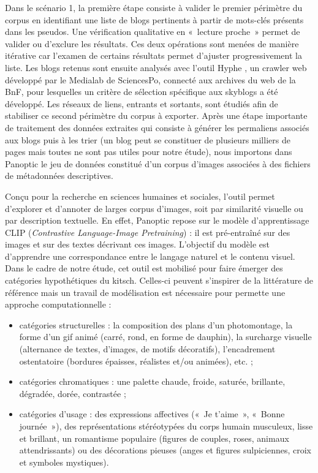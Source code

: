 \documentclass[final, fra]{anthology-ch}     %
\begin{document}
Dans le scénario 1, la première étape consiste à valider le premier périmètre du corpus en identifiant une liste de blogs pertinents à partir de mots-clés présents dans les pseudos. Une vérification qualitative en  «~lecture proche~» permet de valider ou d’exclure les résultats. Ces deux opérations sont menées de manière itérative car l’examen de certains résultats permet d’ajuster progressivement la liste. Les blogs retenus sont ensuite analysés avec l’outil Hyphe \cite{OOGHE-TABANOUHyperlinknotdead2018}, un crawler web développé par le Medialab de SciencesPo, connecté aux archives du web de la BnF, pour lesquelles un critère de sélection spécifique aux skyblogs a été développé. Les réseaux de liens, entrants et sortants, sont étudiés afin de stabiliser ce second périmètre du corpus à exporter.
Après une étape importante de traitement des données extraites qui consiste à générer les permaliens associés aux blogs puis à les trier (un blog peut se constituer de plusieurs milliers de pages mais toutes ne sont pas utiles pour notre étude), nous importons dans Panoptic \cite{ALIEExplorelargedatasets2025, BOUTEPANOPTICoutildexploration2024} le jeu de données constitué d’un corpus d’images associées à des fichiers de métadonnées descriptives. 

Conçu pour la recherche en sciences humaines et sociales, l’outil permet d’explorer et d’annoter de larges corpus d’images, soit par similarité visuelle ou par description textuelle. En effet, Panoptic repose sur le modèle d’apprentissage CLIP (\textit{Contrastive Language-Image Pretraining}) : il est pré-entraîné sur des images et sur des textes décrivant ces images. L’objectif du modèle est d’apprendre une correspondance entre le langage naturel et le contenu visuel. Dans le cadre de notre étude, cet outil est mobilisé pour faire émerger des catégories hypothétiques du kitsch. Celles-ci peuvent s'inspirer de la littérature de référence mais un travail de modélisation est nécessaire pour permette une approche computationnelle : 
\begin{itemize}
    \item catégories structurelles : la composition des plans d’un photomontage, la forme d’un gif animé (carré, rond, en forme de dauphin), la surcharge visuelle (alternance de textes, d’images, de motifs décoratifs), l’encadrement ostentatoire (bordures épaisses, réalistes et/ou animées), etc. ;
    \item catégories chromatiques : une palette chaude, froide, saturée, brillante, dégradée, dorée, contrastée ;
    \item catégories d’usage : des expressions affectives («~Je t’aime~», «~Bonne journée~»), des représentations stéréotypées du corps humain musculeux, lisse et brillant, un romantisme populaire (figures de couples, roses, animaux attendrissants) ou des décorations pieuses (anges et figures sulpiciennes, croix et symboles mystiques).
\end{itemize}
\end{document}
